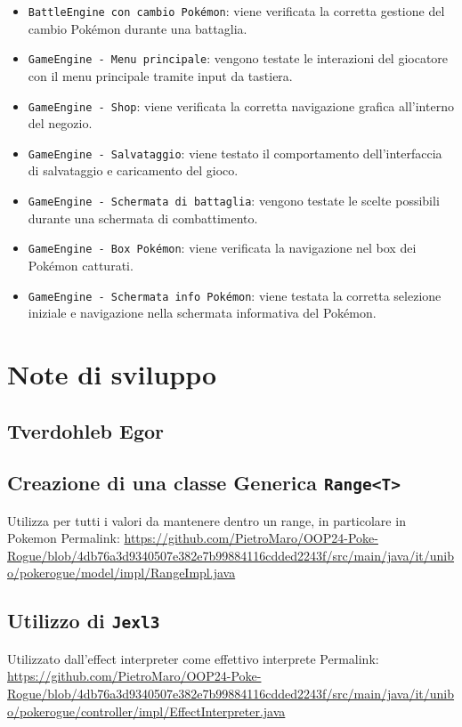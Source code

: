 \documentclass[a4paper,12pt]{report}
\begin{document}
{{\begin{itemize}
    \item \texttt{BattleEngine con cambio Pokémon}: viene verificata la corretta gestione del cambio Pokémon durante una battaglia.
    \item \texttt{GameEngine - Menu principale}: vengono testate le interazioni del giocatore con il menu principale tramite input da tastiera.
    \item \texttt{GameEngine - Shop}: viene verificata la corretta navigazione grafica all’interno del negozio.
    \item \texttt{GameEngine - Salvataggio}: viene testato il comportamento dell'interfaccia di salvataggio e caricamento del gioco.
    \item \texttt{GameEngine - Schermata di battaglia}: vengono testate le scelte possibili durante una schermata di combattimento.
    \item \texttt{GameEngine - Box Pokémon}: viene verificata la navigazione nel box dei Pokémon catturati.
    \item \texttt{GameEngine - Schermata info Pokémon}: viene testata la corretta selezione iniziale e navigazione nella schermata informativa del Pokémon.
\end{itemize}



\section{Note di sviluppo}

\subsection{Tverdohleb Egor}
\subsection*{Creazione di una classe Generica \texttt{Range<T>}}
Utilizza per tutti i valori da mantenere dentro un range, in particolare in Pokemon
Permalink: \url{https://github.com/PietroMaro/OOP24-Poke-Rogue/blob/4db76a3d9340507e382e7b99884116cdded2243f/src/main/java/it/unibo/pokerogue/model/impl/RangeImpl.java}

\subsection*{Utilizzo di \texttt{Jexl3}}
Utilizzato dall'effect interpreter come effettivo interprete 
Permalink: \url{https://github.com/PietroMaro/OOP24-Poke-Rogue/blob/4db76a3d9340507e382e7b99884116cdded2243f/src/main/java/it/unibo/pokerogue/controller/impl/EffectInterpreter.java}

}}
\end{document}
